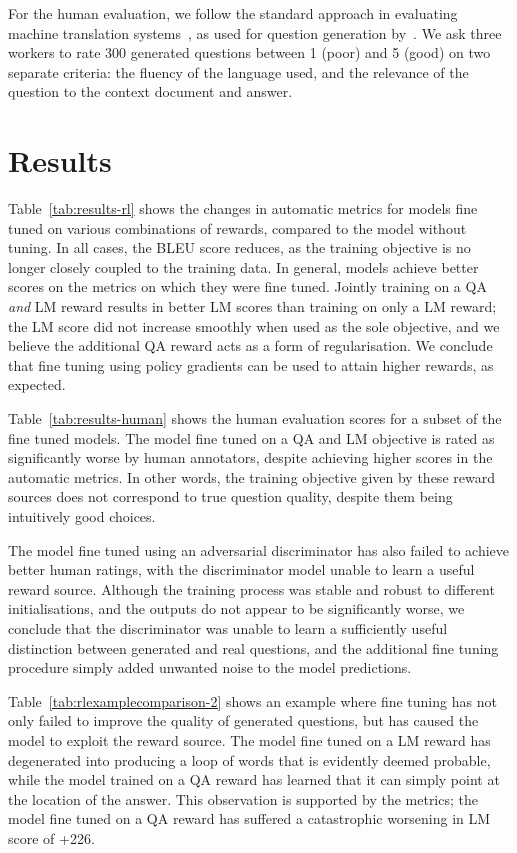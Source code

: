 \documentclass[11pt,a4paper]{article}
\begin{document}
For the human evaluation, we follow the standard approach in evaluating machine translation systems~\cite{Koehn2006}, as used for question generation by~\citet{Du2018}. We ask three workers to rate 300 generated questions between 1 (poor) and 5 (good) on two separate criteria: the fluency of the language used, and the relevance of the question to the context document and answer.





\section{Results}

Table~\ref{tab:results-rl} shows the changes in automatic metrics for models fine tuned on various combinations of rewards, compared to the model without tuning. In all cases, the BLEU score reduces, as the training objective is no longer closely coupled to the training data. In general, models achieve better scores on the metrics on which they were fine tuned. Jointly training on a QA \textit{and} LM reward results in better LM scores than training on only a LM reward; the LM score did not increase smoothly when used as the sole objective, and we believe the additional QA reward acts as a form of regularisation. We conclude that fine tuning using policy gradients can be used to attain higher rewards, as expected.

Table~\ref{tab:results-human} shows the human evaluation scores for a subset of the fine tuned models. The model fine tuned on a QA and LM objective is rated as significantly worse by human annotators, despite achieving higher scores in the automatic metrics. In other words, the training objective given by these reward sources does not correspond to true question quality, despite them being intuitively good choices.

The model fine tuned using an adversarial discriminator has also failed to achieve better human ratings, with the discriminator model unable to learn a useful reward source. Although the training process was stable and robust to different initialisations, and the outputs do not appear to be significantly worse, we conclude that the discriminator was unable to learn a sufficiently useful distinction between generated and real questions, and the additional fine tuning procedure simply added unwanted noise to the model predictions.

Table~\ref{tab:rlexamplecomparison-2} shows an example where fine tuning has not only failed to improve the quality of generated questions, but has caused the model to exploit the reward source. The model fine tuned on a LM reward has degenerated into producing a loop of words that is evidently deemed probable, while the model trained on a QA reward has learned that it can simply point at the location of the answer. This observation is supported by the metrics; the model fine tuned on a QA reward has suffered a catastrophic worsening in LM score of +226.
\end{document}
